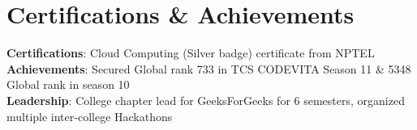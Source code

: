 \documentclass[letterpaper,11pt]{article}
\begin{document}
\section{Certifications \& Achievements}
 \begin{itemize}[leftmargin=0.15in, label={}]
    \small{\item{
     \textbf{Certifications}: Cloud Computing (Silver badge) certificate from NPTEL \\
     \textbf{Achievements}: Secured Global rank 733 in TCS CODEVITA Season 11 \& 5348 Global rank in season 10 \\
     \textbf{Leadership}: College chapter lead for GeeksForGeeks for 6 semesters, organized multiple inter-college Hackathons
    }}
 \end{itemize}

\end{document}
